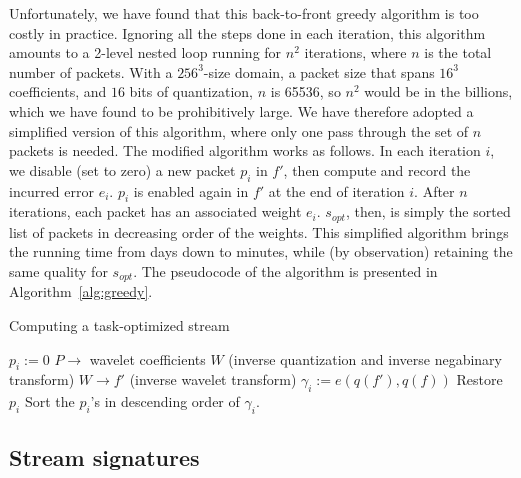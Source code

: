 Unfortunately, we have found that this back-to-front greedy algorithm is too costly in practice.
Ignoring all the steps done in each iteration, this algorithm amounts to a 2-level nested loop
running for $n^2$ iterations, where $n$ is the total number of packets. With a $256^3$-size domain,
a packet size that spans $16^3$ coefficients, and $16$ bits of quantization, $n$ is 65536, so $n^2$
would be in the billions, which we have found to be prohibitively large. We have therefore adopted a
simplified version of this algorithm, where only one pass through the set of $n$ packets is needed.
The modified algorithm works as follows. In each iteration $i$, we disable (set to zero) a new
packet $p_i$ in $f'$, then compute and record the incurred error $e_i$. $p_i$ is enabled again in
$f'$ at the end of iteration $i$. After $n$ iterations, each packet has an associated weight $e_i$.
$s_{opt}$, then, is simply the sorted list of packets in decreasing order of the weights. This
simplified algorithm brings the running time from days down to minutes, while (by observation)
retaining the same quality for $s_{opt}$. The pseudocode of the algorithm is presented in
Algorithm~\autoref{alg:greedy}.

\begin{algorithm}[h]
  \small
  \caption{Computing a task-optimized stream}
  \begin{algorithmic}[1]
			\State $p_i := 0$
      \State $P \rightarrow$ wavelet coefficients $W$ (inverse quantization and inverse negabinary transform)
			\State $W \rightarrow f'$ (inverse wavelet transform)
			\State $\gamma_i := e(q(f'),q(f))$			
			\State Restore $p_i$
		\EndFor
		\State Sort the $p_i$'s in descending order of $\gamma_i$.
	\end{algorithmic}
	\label{alg:greedy}
\end{algorithm}

\subsection{Stream signatures}\label{sec:stream-signature}

